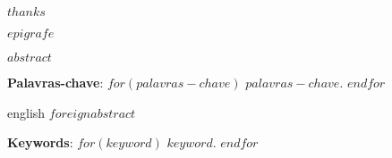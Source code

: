 \documentclass[
	12pt,				%
	oneside,			%
	a4paper,			%
	chapter=TITLE,		%
	section=TITLE,		%
	english,			%
	brazil				%
	]{abntex2}
\begin{document}
\begin{agradecimentos}
	$thanks$
\end{agradecimentos}

\begin{epigrafe}
	\vspace*{\fill}
	\begin{flushright}
		\textit{$epigrafe$}
	\end{flushright}
\end{epigrafe}


\setlength{\absparsep}{18pt} %
\begin{resumo}
	\SingleSpacing
  $abstract$ 
  
  \textbf{Palavras-chave}: 
  $for(palavras-chave)$
  $palavras-chave$.
  $endfor$
\end{resumo}

\begin{resumo}[Abstract]
	\SingleSpacing
	\begin{otherlanguage*}{english}
		$foreignabstract$
		
		\textbf{Keywords}:
	  $for(keyword)$
    $keyword$.
    $endfor$
	\end{otherlanguage*}
\end{resumo}

% 
%
%  

{%
	\hypersetup{hidelinks}
	\listoffigures*
	\cleardoublepage
	
	\listofquadros*
	\cleardoublepage
	
	\listoftables*
	\cleardoublepage
	
	\imprimirlistadesiglas
	
	\imprimirlistadesimbolos
	
	\tableofcontents*
	\cleardoublepage
	
}%
\end{document}
